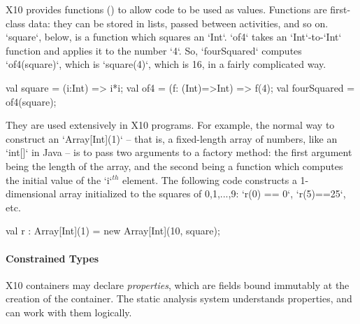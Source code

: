 X10 provides functions () to allow code to be used
as values.  Functions are first-class data: they can be stored in lists,
passed between activities, and so on.  \xcd`square`, below, is a function
which squares an \xcd`Int`.  \xcd`of4` takes an \xcd`Int`-to-\xcd`Int`
function and applies it to the number \xcd`4`.  So, \xcd`fourSquared` computes
\xcd`of4(square)`, which is \xcd`square(4)`, which is 16, in a fairly
complicated way.
\begin{xten}
  val square = (i:Int) => i*i;
  val of4 = (f: (Int)=>Int) => f(4);
  val fourSquared = of4(square);
\end{xten}



They are used extensively in X10
programs.  For example, the normal way to construct an \xcd`Array[Int](1)` --
that is, a fixed-length array of numbers, like an \xcd`int[]` in Java -- is to
pass two arguments to a factory method: the first argument being the length of
the array, and the second being a function which computes the initial value of
the \xcd`i`{$^{th}$} element.  The following code constructs a 1-dimensional
array 
initialized to the squares of 0,1,...,9: \xcd`r(0) == 0`, \xcd`r(5)==25`, etc. 
\begin{xten}
  val r : Array[Int](1) = new Array[Int](10, square);
\end{xten}








\paragraph{Constrained Types}

X10 containers may declare {\em properties}, which are fields bound immutably
at the creation of the container.  The static analysis system understands
properties, and can work with them logically.   


